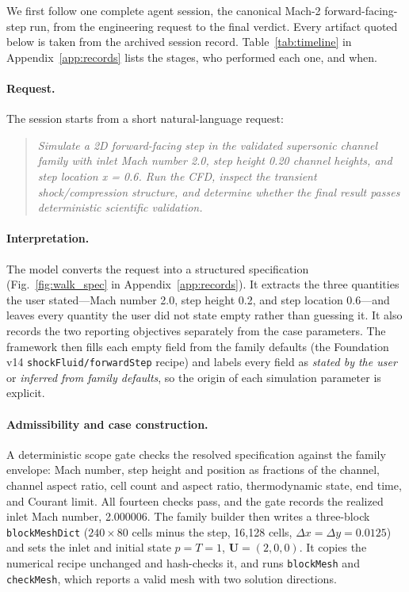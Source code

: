 \documentclass[11pt]{article}
\begin{document}
We first follow one complete agent session, the canonical Mach-2
forward-facing-step run, from the engineering request to the final verdict.
Every artifact quoted below is taken from the archived session record.
Table~\ref{tab:timeline} in Appendix~\ref{app:records} lists the stages, who performed each one, and when.

\paragraph{Request.} The session starts from a short natural-language request:

\begin{quote}\small\itshape
Simulate a 2D forward-facing step in the validated supersonic channel family
with inlet Mach number 2.0, step height 0.20 channel heights, and step location
x = 0.6. Run the CFD, inspect the transient shock/compression structure, and
determine whether the final result passes deterministic scientific validation.
\end{quote}

\paragraph{Interpretation.} The model converts the request into a structured
specification (Fig.~\ref{fig:walk_spec} in Appendix~\ref{app:records}). It extracts the three quantities
the user stated---Mach number 2.0, step height 0.2, and step location
0.6---and leaves every quantity the user did not state empty rather than
guessing it. It also records the two reporting objectives separately from
the case parameters. The framework then fills each empty field from the
family defaults (the Foundation v14 \texttt{shockFluid/forwardStep} recipe)
and labels every field as \emph{stated by the user} or \emph{inferred from
family defaults}, so the origin of each simulation parameter is explicit.

\paragraph{Admissibility and case construction.} A deterministic scope gate
checks the resolved specification against the family envelope: Mach number,
step height and position as fractions of the channel, channel aspect ratio,
cell count and aspect ratio, thermodynamic state, end time, and Courant
limit. All fourteen checks pass, and the gate records the realized inlet
Mach number, 2.000006. The family builder then writes a three-block
\texttt{blockMeshDict} ($240\times80$ cells minus the step, 16,128 cells,
$\Delta x=\Delta y=0.0125$) and sets the inlet and initial state
$p=T=1$, $\mathbf{U}=(2,0,0)$. It copies the numerical recipe unchanged and
hash-checks it, and runs \texttt{blockMesh} and \texttt{checkMesh}, which
reports a valid mesh with two solution directions.
\end{document}
